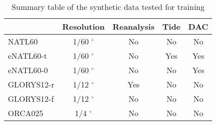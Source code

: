 \begin{table}[h!]
    \centering
\begin{tabular}{l||cccc|}
\toprule
{} & Resolution & Reanalysis & Tide & DAC  \\
\midrule
NATL60\cite{Ajayi_Le_Sommer_Chassignet_Molines_Xu_Albert_Cosme_2020}               &      1/60 $^\circ$ &               No &            No &                   No  \\
eNATL60-t\cite{Brodeau_Sommer_Albert_2020}         &      1/60 $^\circ$ &               No &           Yes &                  Yes  \\
eNATL60-0\cite{Brodeau_Sommer_Albert_2020}         &      1/60 $^\circ$ &               No &            No &                  Yes  \\
GLORYS12-r\cite{Jean_Michel_Eric_Romain_Gilles_Angélique_Marie_Clément_Mathieu_Olivier_Charly_et_al._2021} &      1/12 $^\circ$ &              Yes &            No &                   No  \\
GLORYS12-f\cite{Jean_Michel_Eric_Romain_Gilles_Angélique_Marie_Clément_Mathieu_Olivier_Charly_et_al._2021}   &      1/12 $^\circ$ &               No &            No &                   No  \\
ORCA025 \cite{Bernard_Madec_Penduff_Molines_Treguier_Le_Sommer_Beckmann_Biastoch_Böning_Dengg_et_al._2006}             &       1/4 $^\circ$ &               No &            No &                   No  \\
\bottomrule
\end{tabular}
\caption{Summary table of the synthetic data tested for training}
\label{tab:data}
\end{table}